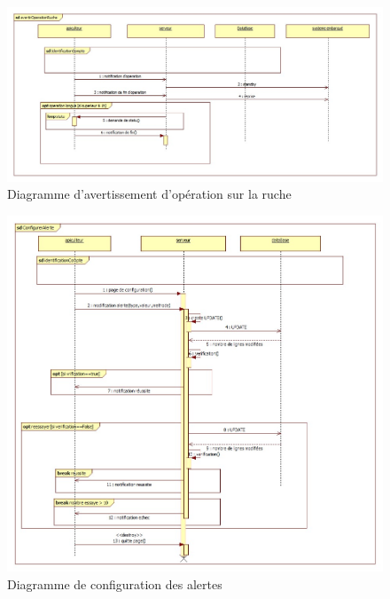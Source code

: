 \begin{figure}[h!]
\centering\includegraphics[scale=0.5]{avertirOperationRuche.jpg}
\caption{\label{fig:seq3} Diagramme d'avertissement d'opération sur la ruche}
\end{figure}
\begin{figure}[h!]
\centering\includegraphics[scale=0.5]{configurerAlerte.jpg}
\caption{\label{fig:seq4} Diagramme de configuration des alertes}
\end{figure}
